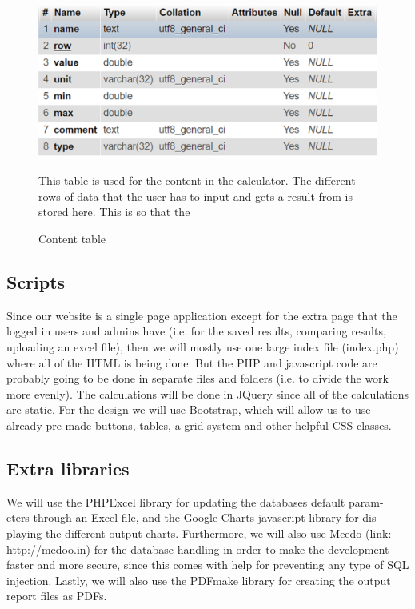 \documentclass[]{article}
\begin{document}
\begin{figure}[H]
	\includegraphics[width=1.0\linewidth]{Bild9}
	\caption{Content table}
	\medskip
	\small
	This table is used for the content in the calculator. The different rows of data that the user has to input and gets a result from is stored here. This is so that the 
	\label{fig:Bild9}
\end{figure}

\subsection{Scripts}
Since our website is a single page application except for the extra page that the
logged in users and admins have (i.e. for the saved results, comparing results,
uploading an excel file), then we will mostly use one large index file (index.php) where all of the HTML is being done. But the PHP and javascript code are probably going to be done in separate files and folders (i.e. to divide the work more evenly). The calculations will be done in JQuery since all of the calculations are static. For the design we will use Bootstrap, which will allow us to use already pre-made buttons, tables, a grid system and other helpful CSS classes. 

\subsection{Extra libraries}
We will use the PHPExcel library for updating the databases default param-
eters through an Excel file, and the Google Charts javascript library for dis-
playing the different output charts. Furthermore, we will also use Meedo (link:
http://medoo.in) for the database handling in order to make the development
faster and more secure, since this comes with help for preventing any type of
SQL injection. Lastly, we will also use the PDFmake library for creating the output report files as PDFs.
\end{document}
